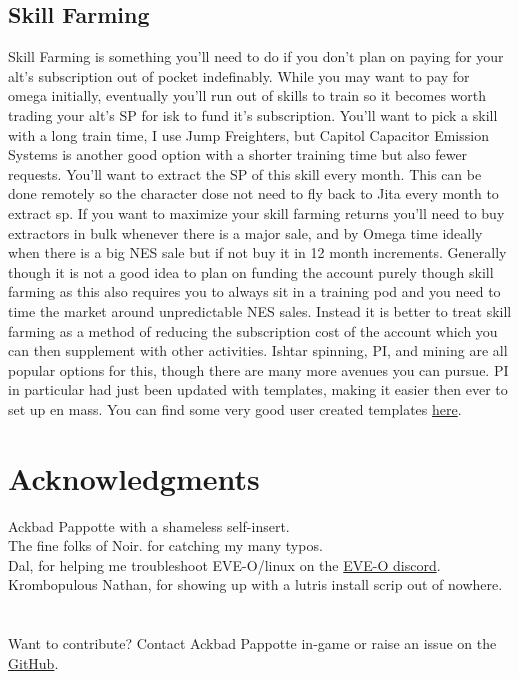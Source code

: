 \documentclass{article}
\begin{document}
\subsection{Skill Farming}
Skill Farming is something you'll need to do if you don't plan on paying for your alt's subscription out of pocket indefinably. While you may want to pay 
for omega initially, eventually you'll run out of skills to train so it becomes worth trading your alt's SP for isk to fund it's subscription. You'll want 
to pick a skill with a long train time, I use Jump Freighters, but Capitol Capacitor Emission Systems is another good option with a shorter training time 
but also fewer requests. You'll want to extract the SP of this skill every month. This can be done remotely so the character dose not need to fly back to 
Jita every month to extract sp. If you want to maximize your skill farming returns you'll need to buy extractors in bulk whenever there is a major sale, 
and by Omega time ideally when there is a big NES sale but if not buy it in 12 month increments. Generally though it is not a good idea to plan on funding
the account purely though skill farming as this also requires you to always sit in a training pod and you need to time the market around unpredictable NES
sales. Instead it is better to treat skill farming as a method of reducing the subscription cost of the account which you can then supplement with other
activities. Ishtar spinning, PI, and mining are all popular options for this, though there are many more avenues you can pursue. PI in particular had just 
been updated with templates, making it easier then ever to set up en mass. You can find some very good user created templates \href{URLhttps://github.com/DalShooth/EVE_PI_Templates}{here}.

\clearpage
\section{Acknowledgments}
Ackbad Pappotte with a shameless self-insert.\\
The fine folks of Noir. for catching my many typos.\\
Dal, for helping me troubleshoot EVE-O/linux on the \href{https://discord.gg/xYt8R9AFXB}{EVE-O discord}. \\
Krombopulous Nathan, for showing up with a lutris install scrip out of nowhere. \\
\\
\\
Want to contribute? Contact Ackbad Pappotte in-game or raise an issue on the \href{https://github.com/AckbadP/eve-multi-guide}{GitHub}.  
\\
\end{document}
